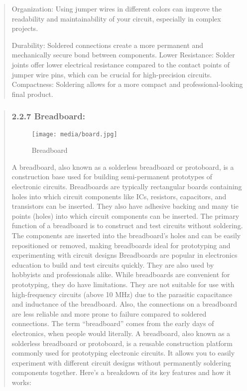 \documentclass[12pt]{report}
\begin{document}
\begin{quote}
				Organization: Using jumper wires in different colors can improve the readability and maintainability of your circuit, especially in complex projects.
				
				Durability: Soldered connections create a more permanent and mechanically secure bond between components.
				Lower Resistance: Solder joints offer lower electrical resistance compared to the contact points of jumper wire pins, which can be crucial for high-precision circuits.
				Compactness: Soldering allows for a more compact and professional-looking final product.
				
				\end{quote}
				\clearpage
				
				
				\begin{quote}
				\subsubsection{2.2.7  Breadboard:}
					\begin{figure}[htbp]
						\centering
						\texttt{[image: media/board.jpg]}
						\caption{Breadboard}
					\end{figure}
					
				A breadboard, also known as a solderless breadboard or protoboard, is a construction base used for building semi-permanent prototypes of electronic circuits. Breadboards are typically rectangular boards containing holes into which circuit components like ICs, resistors, capacitors, and transistors can be inserted. They also have adhesive backing and many tie points (holes) into which circuit components can be inserted. The primary function of a breadboard is to construct and test circuits without soldering. The components are inserted into the breadboard’s holes and can be easily repositioned or removed, making breadboards ideal for prototyping and experimenting with circuit designs Breadboards are popular in electronics education to build and test circuits quickly. They are also used by hobbyists and professionals alike. While breadboards are convenient for prototyping, they do have limitations. They are not suitable for use with high-frequency circuits (above 10 MHz) due to the parasitic capacitance and inductance of the breadboard. Also, the connections on a breadboard are less reliable and more prone to failure compared to soldered connections. The term “breadboard” comes from the early days of electronics, when people would literally.
				A breadboard, also known as a solderless breadboard or protoboard, is a reusable construction platform commonly used for prototyping electronic circuits. It allows you to easily experiment with different circuit designs without permanently soldering components together. Here's a breakdown of its key features and how it works:
				

\end{quote}
\end{document}

